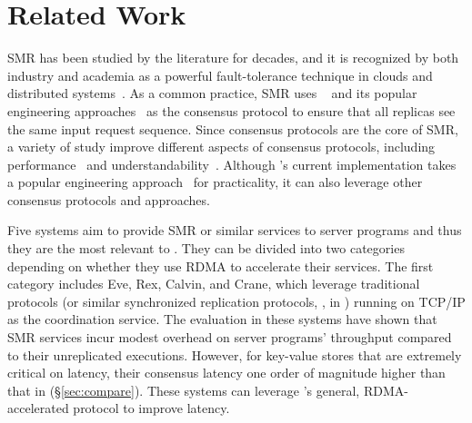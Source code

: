 \section{Related Work} \label{sec:related}


   SMR 
has been studied by the literature 
for decades, and it is recognized by both industry and academia as a powerful 
fault-tolerance technique in clouds and distributed 
systems~\cite{lamportclock,smr:tutorial}. As a common practice, SMR uses 
\paxos~\cite{paxos,paxos:simple,paxos:complex} and its popular engineering 
approaches~\cite{paxos:live,paxos:practical} as the consensus protocol to 
ensure that all replicas see the same input request sequence. Since consensus 
protocols are the core of SMR, a variety of study improve different aspects of 
consensus protocols, including performance~\cite{epaxos:sosp13,paxos:fast} and 
understandability~\cite{raft:usenix14}. Although \xxx's current implementation 
takes a popular engineering approach~\cite{paxos:practical} for practicality, 
it can also leverage other consensus protocols and approaches.

Five systems aim to provide SMR or similar services to server programs and 
thus they are the most relevant to \xxx. They can be divided into two 
categories depending on whether they use RDMA to accelerate their services. 
The first category includes Eve, Rex, Calvin, and Crane, which 
leverage traditional \paxos protocols (or similar synchronized replication 
protocols, \eg, \zookeeper in \calvin) running on TCP/IP as the coordination 
service. The evaluation in these systems have shown that SMR services incur 
modest overhead on server programs' throughput compared to their unreplicated 
executions. However, for key-value stores that are extremely critical on 
latency, their consensus latency one order of magnitude higher than that in 
\xxx (\S\ref{sec:compare}). These systems can leverage \xxx's general, 
RDMA-accelerated protocol to improve latency.


